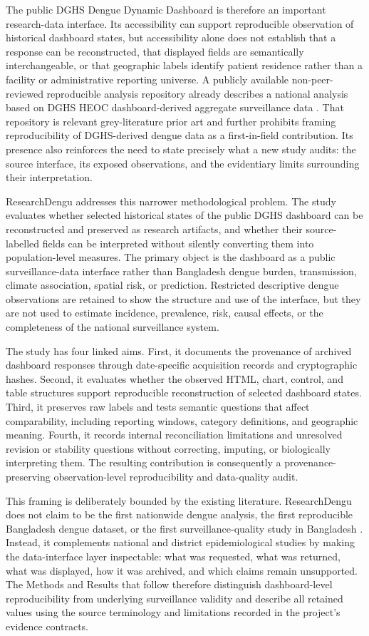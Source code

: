 The public DGHS Dengue Dynamic Dashboard is therefore an important research-data interface. Its accessibility can support reproducible observation of historical dashboard states, but accessibility alone does not establish that a response can be reconstructed, that displayed fields are semantically interchangeable, or that geographic labels identify patient residence rather than a facility or administrative reporting universe. A publicly available non-peer-reviewed reproducible analysis repository already describes a national analysis based on DGHS HEOC dashboard-derived aggregate surveillance data \citep{ref5}. That repository is relevant grey-literature prior art and further prohibits framing reproducibility of DGHS-derived dengue data as a first-in-field contribution. Its presence also reinforces the need to state precisely what a new study audits: the source interface, its exposed observations, and the evidentiary limits surrounding their interpretation.

ResearchDengu addresses this narrower methodological problem. The study evaluates whether selected historical states of the public DGHS dashboard can be reconstructed and preserved as research artifacts, and whether their source-labelled fields can be interpreted without silently converting them into population-level measures. The primary object is the dashboard as a public surveillance-data interface rather than Bangladesh dengue burden, transmission, climate association, spatial risk, or prediction. Restricted descriptive dengue observations are retained to show the structure and use of the interface, but they are not used to estimate incidence, prevalence, risk, causal effects, or the completeness of the national surveillance system.

The study has four linked aims. First, it documents the provenance of archived dashboard responses through date-specific acquisition records and cryptographic hashes. Second, it evaluates whether the observed HTML, chart, control, and table structures support reproducible reconstruction of selected dashboard states. Third, it preserves raw labels and tests semantic questions that affect comparability, including reporting windows, category definitions, and geographic meaning. Fourth, it records internal reconciliation limitations and unresolved revision or stability questions without correcting, imputing, or biologically interpreting them. The resulting contribution is consequently a provenance-preserving observation-level reproducibility and data-quality audit.

This framing is deliberately bounded by the existing literature. ResearchDengu does not claim to be the first nationwide dengue analysis, the first reproducible Bangladesh dengue dataset, or the first surveillance-quality study in Bangladesh \citep{ref1,ref2,ref3,ref4,ref5,ref6,ref7}. Instead, it complements national and district epidemiological studies by making the data-interface layer inspectable: what was requested, what was returned, what was displayed, how it was archived, and which claims remain unsupported. The Methods and Results that follow therefore distinguish dashboard-level reproducibility from underlying surveillance validity and describe all retained values using the source terminology and limitations recorded in the project's evidence contracts.
